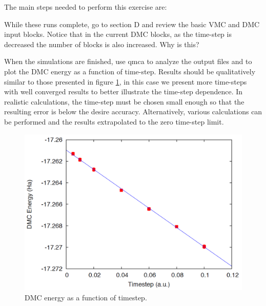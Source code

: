 The main steps needed to perform this exercise are:
While these runs complete, go to section D and review the basic VMC and DMC input
blocks. Notice that in the current DMC blocks, as the time-step is decreased the number of blocks is also increased. Why is this?

When the simulations are finished, use qmca to analyze the output files and to plot the
DMC energy as a function of time-step. Results should be qualitatively similar to those
presented in figure \ref{fig:lam_dmc_timestep}, in this case we present more time-steps with well converged results to
better illustrate the time-step dependence. In realistic calculations, the time-step must be
chosen small enough so that the resulting error is below the desire accuracy. Alternatively,
various calculations can be performed and the results extrapolated to the zero time-step
limit.


\begin{figure}
\begin{center}
\includegraphics[trim = 0mm 0mm 0mm 0mm, clip,width=0.75\columnwidth]{figures/lab_advanced_molecules_dmc_timestep.png}
\end{center}
\caption{DMC energy as a function of timestep.}
\label{fig:lam_dmc_timestep}
\end{figure}



